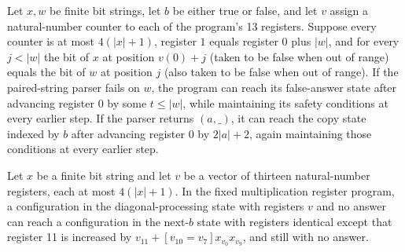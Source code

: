 \begin{lemma}
\label{Complexity.mult_scan}
\leanok
{}
Let $x,w$ be finite bit strings, let $b$ be either true or false, and let $v$ assign a
natural-number counter to each of the program’s 13 registers. Suppose every counter is
at most $4(|x|+1)$, register $1$ equals register $0$ plus $|w|$, and for every $j<|w|$
the bit of $x$ at position $v(0)+j$ (taken to be false when out of range) equals the bit
of $w$ at position $j$ (also taken to be false when out of range). If the paired-string
parser fails on $w$, the program can reach its false-answer state after advancing
register $0$ by some $t\le |w|$, while maintaining its safety conditions at every
earlier step. If the parser returns $(a,\_)$, it can reach the copy state indexed by $b$
after advancing register $0$ by $2|a|+2$, again maintaining those conditions at every
earlier step.
\end{lemma}

\begin{lemma}
\label{Complexity.mult_contribution}
\leanok
{}
Let $x$ be a finite bit string and let $v$ be a vector of thirteen natural-number
registers, each at most $4(|x|+1)$. In the fixed multiplication register program, a
configuration in the diagonal-processing state with registers $v$ and no answer can
reach a configuration in the next-$b$ state with registers identical except that
register 11 is increased by $v_{11}+[v_{10}=v_7]x_{v_0}x_{v_9}$, and still with no
answer.
\end{lemma}

